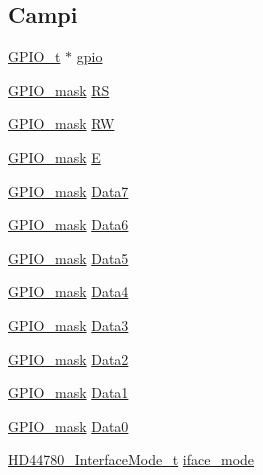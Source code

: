 \subsection*{Campi}
\begin{DoxyCompactItemize}
\item 
\hyperlink{struct_g_p_i_o__t}{G\+P\+I\+O\+\_\+t} $\ast$ \hyperlink{struct_h_d44780___l_c_d__t_acb3116190992a4d8d26545c103304d27}{gpio}
\item 
\hyperlink{group___g_p_i_o_ga6d5aef8a8a54ee2f602d47252ff66595}{G\+P\+I\+O\+\_\+mask} \hyperlink{struct_h_d44780___l_c_d__t_a142ae0db638dca7ab42e2183a1311d32}{R\+S}
\item 
\hyperlink{group___g_p_i_o_ga6d5aef8a8a54ee2f602d47252ff66595}{G\+P\+I\+O\+\_\+mask} \hyperlink{struct_h_d44780___l_c_d__t_af8225e4a125a2159215dfa03372c305f}{R\+W}
\item 
\hyperlink{group___g_p_i_o_ga6d5aef8a8a54ee2f602d47252ff66595}{G\+P\+I\+O\+\_\+mask} \hyperlink{struct_h_d44780___l_c_d__t_a851ed1cefdadae2e5069d1364ae8fc9e}{E}
\item 
\hyperlink{group___g_p_i_o_ga6d5aef8a8a54ee2f602d47252ff66595}{G\+P\+I\+O\+\_\+mask} \hyperlink{struct_h_d44780___l_c_d__t_a7f1bd9ea66e1fa6d0667c3f60d2f155d}{Data7}
\item 
\hyperlink{group___g_p_i_o_ga6d5aef8a8a54ee2f602d47252ff66595}{G\+P\+I\+O\+\_\+mask} \hyperlink{struct_h_d44780___l_c_d__t_a6a787746d32e0e18dbd57202e547756b}{Data6}
\item 
\hyperlink{group___g_p_i_o_ga6d5aef8a8a54ee2f602d47252ff66595}{G\+P\+I\+O\+\_\+mask} \hyperlink{struct_h_d44780___l_c_d__t_aff5ae7b6e5cd6f96a13e719cd07e3f15}{Data5}
\item 
\hyperlink{group___g_p_i_o_ga6d5aef8a8a54ee2f602d47252ff66595}{G\+P\+I\+O\+\_\+mask} \hyperlink{struct_h_d44780___l_c_d__t_a923c685eba8920c56f33117410da2742}{Data4}
\item 
\hyperlink{group___g_p_i_o_ga6d5aef8a8a54ee2f602d47252ff66595}{G\+P\+I\+O\+\_\+mask} \hyperlink{struct_h_d44780___l_c_d__t_ae6f2e7b5a4aa8b82451e021f2f5b3a89}{Data3}
\item 
\hyperlink{group___g_p_i_o_ga6d5aef8a8a54ee2f602d47252ff66595}{G\+P\+I\+O\+\_\+mask} \hyperlink{struct_h_d44780___l_c_d__t_afb22274224118a94688f1809cda55501}{Data2}
\item 
\hyperlink{group___g_p_i_o_ga6d5aef8a8a54ee2f602d47252ff66595}{G\+P\+I\+O\+\_\+mask} \hyperlink{struct_h_d44780___l_c_d__t_a9b310a22b76c920feb015a3a3084b125}{Data1}
\item 
\hyperlink{group___g_p_i_o_ga6d5aef8a8a54ee2f602d47252ff66595}{G\+P\+I\+O\+\_\+mask} \hyperlink{struct_h_d44780___l_c_d__t_aed1ef3393be1a14aa7b2644585e5bb08}{Data0}
\item 
\hyperlink{group___l_c_d_gaaaea8b73e24f7658da4118f6b01b45f0}{H\+D44780\+\_\+\+Interface\+Mode\+\_\+t} \hyperlink{struct_h_d44780___l_c_d__t_a7c5a51b8cc5de5ee2cf42b884bd1bc67}{iface\+\_\+mode}
\end{DoxyCompactItemize}


